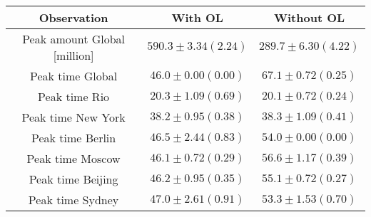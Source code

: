 \begin{tabular}[H]{c | c | c}
Observation & With OL & Without OL \\ \hline
 Peak amount Global [million]& $590.3\pm 3.34 (2.24)$ & $289.7 \pm 6.30 (4.22)$\\
 Peak time Global & $46.0\pm 0.00( 0.00)$ & $67.1 \pm 0.72 (0.25)$\\
 Peak time Rio & $20.3\pm 1.09( 0.69)$ & $20.1 \pm 0.72 (0.24)$\\
 Peak time New York & $38.2\pm 0.95( 0.38)$ & $38.3 \pm 1.09 (0.41)$\\
 Peak time Berlin & $46.5\pm 2.44( 0.83)$ & $54.0 \pm 0.00 (0.00)$\\
 Peak time Moscow & $46.1\pm 0.72( 0.29)$ & $56.6 \pm 1.17 (0.39)$\\
 Peak time Beijing & $46.2\pm 0.95( 0.35)$ & $55.1 \pm 0.72 (0.27)$\\
 Peak time Sydney & $47.0\pm 2.61( 0.91)$ & $53.3 \pm 1.53 (0.70)$
\end{tabular}
